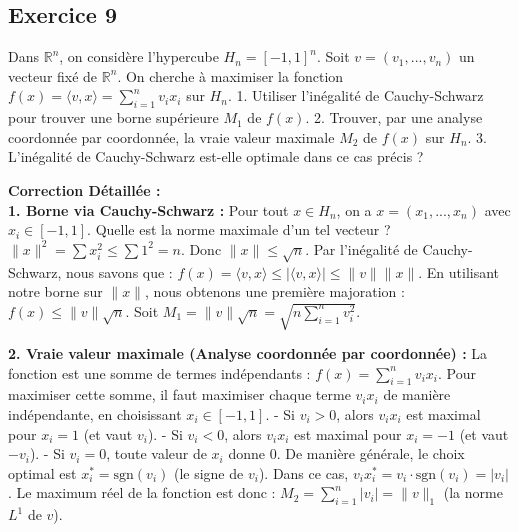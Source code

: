 \documentclass[11pt,a4paper]{report}
\begin{document}
\subsection*{Exercice 9}

Dans $\mathbb{R}^n$, on considère l'hypercube $H_n = [-1, 1]^n$. Soit $v = (v_1, ..., v_n)$ un vecteur fixé de $\mathbb{R}^n$.
On cherche à maximiser la fonction $f(x) = \langle v, x \rangle = \sum_{i=1}^n v_i x_i$ sur $H_n$.
1. Utiliser l'inégalité de Cauchy-Schwarz pour trouver une borne supérieure $M_1$ de $f(x)$.
2. Trouver, par une analyse coordonnée par coordonnée, la vraie valeur maximale $M_2$ de $f(x)$ sur $H_n$.
3. L'inégalité de Cauchy-Schwarz est-elle optimale dans ce cas précis ?

\textbf{Correction Détaillée :}\\ \textbf{1. Borne via Cauchy-Schwarz :}
Pour tout $x \in H_n$, on a $x = (x_1, ..., x_n)$ avec $x_i \in [-1, 1]$.
Quelle est la norme maximale d'un tel vecteur ?
$\|x\|^2 = \sum x_i^2 \le \sum 1^2 = n$. Donc $\|x\| \le \sqrt{n}$.
Par l'inégalité de Cauchy-Schwarz, nous savons que :
$f(x) = \langle v, x \rangle \le |\langle v, x \rangle| \le \|v\| \|x\|$.
En utilisant notre borne sur $\|x\|$, nous obtenons une première majoration :
$f(x) \le \|v\| \sqrt{n}$.
Soit $M_1 = \|v\| \sqrt{n} = \sqrt{n \sum_{i=1}^n v_i^2}$.

\textbf{2. Vraie valeur maximale (Analyse coordonnée par coordonnée) :}
La fonction est une somme de termes indépendants : $f(x) = \sum_{i=1}^n v_i x_i$.
Pour maximiser cette somme, il faut maximiser chaque terme $v_i x_i$ de manière indépendante, en choisissant $x_i \in [-1, 1]$.
- Si $v_i > 0$, alors $v_i x_i$ est maximal pour $x_i = 1$ (et vaut $v_i$).
- Si $v_i < 0$, alors $v_i x_i$ est maximal pour $x_i = -1$ (et vaut $-v_i$).
- Si $v_i = 0$, toute valeur de $x_i$ donne $0$.
De manière générale, le choix optimal est $x_i^* = \text{sgn}(v_i)$ (le signe de $v_i$).
Dans ce cas, $v_i x_i^* = v_i \cdot \text{sgn}(v_i) = |v_i|$.
Le maximum réel de la fonction est donc :
$M_2 = \sum_{i=1}^n |v_i| = \|v\|_1$ (la norme $L^1$ de $v$).
\end{document}
